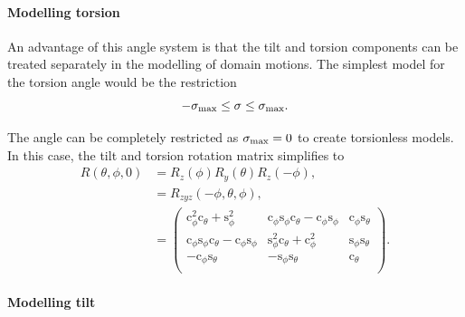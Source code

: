 


\paragraph{Modelling torsion}

An advantage of this angle system is that the tilt and torsion components can be treated separately in the modelling of domain motions.
The simplest model for the torsion angle would be the restriction
\begin{equation} \label{eq: torsion angle restriction}
    -\sigma_\textrm{max} \le \sigma \le \sigma_\textrm{max} .
\end{equation}

The angle can be completely restricted as $\sigma_\textrm{max} = 0$ to create torsionless models.
In this case, the tilt and torsion rotation matrix simplifies to
\begin{subequations}
\begin{align}
    R(\theta, \phi, 0)
        &= R_z(\phi)R_y(\theta)R_z(-\phi) , \\
        &= R_{zyz}(-\phi, \theta, \phi) , \\
        &= \begin{pmatrix}
            \mathrm{c}^2_\phi \mathrm{c}_\theta + \mathrm{s}^2_\phi                                 & \mathrm{c}_\phi \mathrm{s}_\phi \mathrm{c}_\theta - \mathrm{c}_{\phi} \mathrm{s}_\phi & \mathrm{c}_\phi \mathrm{s}_\theta \\
            \mathrm{c}_{\phi} \mathrm{s}_\phi \mathrm{c}_\theta - \mathrm{c}_\phi \mathrm{s}_{\phi} & \mathrm{s}^2_\phi \mathrm{c}_\theta + \mathrm{c}^2_\phi                               & \mathrm{s}_\phi \mathrm{s}_\theta \\
            -\mathrm{c}_{\phi} \mathrm{s}_\theta                                                    & -\mathrm{s}_{\phi} \mathrm{s}_\theta                                                  & \mathrm{c}_\theta \\
        \end{pmatrix} . \label{eq: R matrix torsionless}
\end{align}
\end{subequations}



\paragraph{Modelling tilt}

